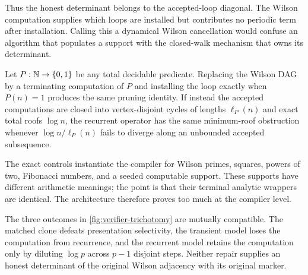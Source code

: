 Thus the honest determinant belongs to the accepted-loop diagonal.  The
Wilson computation supplies which loops are installed but contributes no
periodic term after installation.  Calling this a dynamical Wilson
cancellation would confuse an algorithm that populates a support with the
closed-walk mechanism that owns its determinant.

\begin{corollary}
\label{cor:universal-decider}
Let $P:\mathbb N\to\{0,1\}$ be any total decidable predicate.  Replacing the Wilson
DAG by a terminating computation of $P$ and installing the loop exactly when
$P(n)=1$ produces the same pruning identity.  If instead the accepted
computations are closed into vertex-disjoint cycles of lengths $\ell_P(n)$
and exact total roofs $\log n$, the recurrent operator has the same
minimum-roof obstruction whenever $\log n/\ell_P(n)$ fails to diverge along
an unbounded accepted subsequence.
\end{corollary}

The exact controls instantiate the compiler for Wilson primes, squares,
powers of two, Fibonacci numbers, and a seeded computable support.  These
supports have different arithmetic meanings; the point is that their
terminal analytic wrappers are identical.  The architecture therefore proves
too much at the compiler level.



The three outcomes in \cref{fig:verifier-trichotomy} are mutually compatible.
The matched clone defeats presentation selectivity, the transient model loses
the computation from recurrence, and the recurrent model retains the
computation only by diluting $\log p$ across $p-1$ disjoint steps.  Neither
repair supplies an honest determinant of the original Wilson adjacency with
its original marker.
